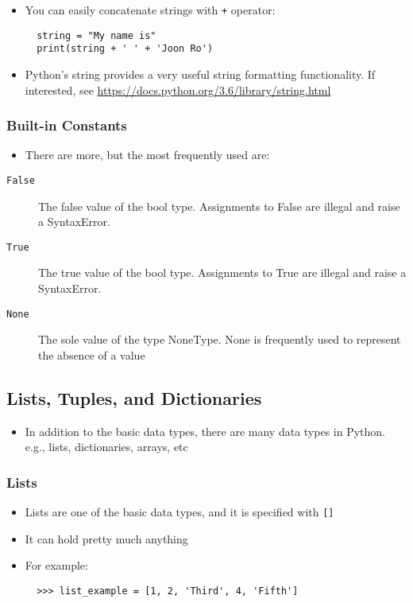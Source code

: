 \documentclass[10pt,article]{article}
\begin{document}
\begin{itemize}
\item You can easily concatenate strings with \texttt{+} operator:

\begin{verbatim}
  string = "My name is"
  print(string + ' ' + 'Joon Ro')
\end{verbatim}

\item Python's string provides a very useful string formatting functionality. If interested, see \url{https://docs.python.org/3.6/library/string.html}
\end{itemize}

\subsubsection{Built-in Constants}
\label{sec:orgbdeed61}
\begin{itemize}
\item There are more, but the most frequently used are:
\end{itemize}



\begin{description}
\item[{\texttt{False}}] The false value of the bool type. Assignments to False are
illegal and raise a SyntaxError.

\item[{\texttt{True}}] The true value of the bool type. Assignments to True are illegal
and raise a SyntaxError.

\item[{\texttt{None}}] The sole value of the type NoneType. None is frequently used to
represent the absence of a value
\end{description}
\subsection{Lists, Tuples, and Dictionaries}
\label{sec:orga1e3edc}
\begin{itemize}
\item In addition to the basic data types, there are many data types in
Python. e.g., lists, dictionaries, arrays, etc
\end{itemize}

\subsubsection{Lists}
\label{sec:org622d57e}
\begin{itemize}
\item Lists are one of the basic data types, and it is specified with \texttt{[]}
\item It can hold pretty much anything
\item For example:

\begin{verbatim}
  >>> list_example = [1, 2, 'Third', 4, 'Fifth']
\end{verbatim}
\end{itemize}
\end{document}
